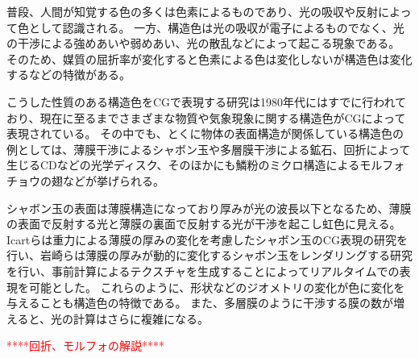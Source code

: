 普段、人間が知覚する色の多くは色素によるものであり、光の吸収や反射によって色として認識される。
一方、構造色は光の吸収が電子によるものでなく、光の干渉による強めあいや弱めあい、光の散乱などによって起こる現象\cite{}である。
そのため、媒質の屈折率が変化すると色素による色は変化しないが構造色は変化するなどの特徴がある。

こうした性質のある構造色をCGで表現する研究は1980年代にはすでに行われており、現在に至るまでさまざまな物質や気象現象に関する構造色がCGによって表現されている。
その中でも、とくに物体の表面構造が関係している構造色の例としては、薄膜干渉によるシャボン玉や多層膜干渉による鉱石、回折によって生じるCDなどの光学ディスク\figref{}、そのほかにも鱗粉のミクロ構造によるモルフォチョウの翅\figref{}などが挙げられる。

シャボン玉の表面は薄膜構造になっており厚みが光の波長以下となるため、薄膜の表面で反射する光と薄膜の裏面で反射する光が干渉を起こし虹色に見える。
Icartら\cite{}は重力による薄膜の厚みの変化を考慮したシャボン玉のCG表現の研究を行い、岩崎ら\cite{}は薄膜の厚みが動的に変化するシャボン玉をレンダリングする研究を行い、事前計算によるテクスチャを生成することによってリアルタイムでの表現を可能とした。
これらのように、形状などのジオメトリの変化が色に変化を与えることも構造色の特徴である。
また、多層膜のように干渉する膜の数が増えると、光の計算はさらに複雑になる。

\textcolor{red}{****回折、モルフォの解説****}

